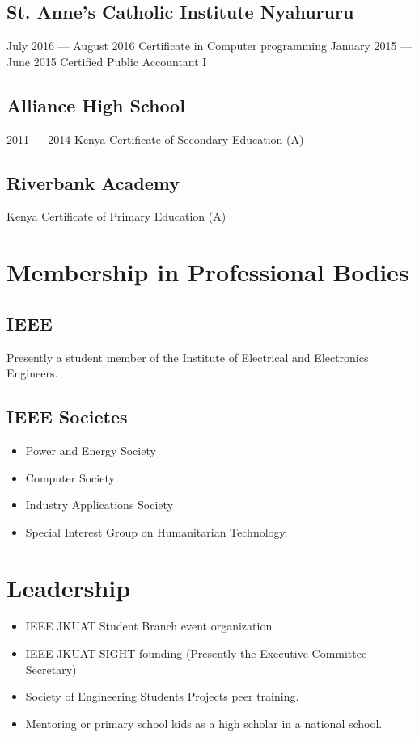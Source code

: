 \documentclass[a4paper]{article}
\begin{document}
\subsection{St. Anne's Catholic Institute Nyahururu}
July 2016 --- August 2016
Certificate in Computer programming
January 2015 --- June 2015
Certified Public Accountant I
\subsection{Alliance High School}
2011 --- 2014
Kenya Certificate of Secondary Education (A)
\subsection{Riverbank Academy}
Kenya Certificate of Primary Education (A)


\section{Membership in Professional Bodies}
\subsection{IEEE}
Presently a student member of the Institute of Electrical and Electronics Engineers.
\subsection{IEEE Societes}
\begin{itemize}
	\item Power and Energy Society
	\item Computer Society
	\item Industry Applications Society
	\item Special Interest Group on Humanitarian Technology.
\end{itemize}

\section{Leadership}
\begin{itemize}
	\item IEEE JKUAT Student Branch event organization
	\item IEEE JKUAT SIGHT founding (Presently the Executive Committee Secretary)
	\item Society of Engineering Students Projects peer training.
	\item Mentoring or primary school kids as a high scholar in a national school.
\end{itemize}
\end{document}
